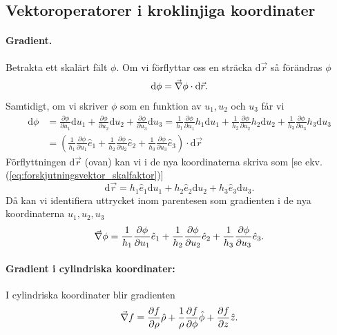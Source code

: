 \documentclass[%
oneside,                 %
final,                   %
10pt]{article}
\begin{document}
\subsection{Vektoroperatorer i kroklinjiga koordinater}

\paragraph{Gradient.}
Betrakta ett skalärt fält $\phi$.  Om vi förflyttar oss en sträcka $\mbox{d}\vec{r}$ så förändras $\phi$ 
\begin{equation}
  \mbox{d}\phi = \vec{\nabla} \phi \cdot \mbox{d}\vec{r}.
\end{equation}
Samtidigt, om vi skriver $\phi$ som en funktion av $u_1, u_2$ och $u_3$ får vi
\begin{align}
  \mbox{d}\phi &= \frac{\partial \phi}{\partial u_1}\mbox{d}u_1 + 
\frac{\partial \phi}{\partial u_2}\mbox{d}u_2 +
\frac{\partial \phi}{\partial u_3}\mbox{d}u_3 =
\frac{1}{h_1} \frac{\partial \phi}{\partial u_1} h_1 \mbox{d}u_1 +
\frac{1}{h_2} \frac{\partial \phi}{\partial u_2} h_2 \mbox{d}u_2 +
\frac{1}{h_3} \frac{\partial \phi}{\partial u_3} h_3 \mbox{d}u_3 \nonumber \\ 
 &=
\left(\frac{1}{h_1} \frac{\partial \phi}{\partial u_1} \hat{e}_1 +
\frac{1}{h_2} \frac{\partial \phi}{\partial u_2} \hat{e}_2 +
\frac{1}{h_3} \frac{\partial \phi}{\partial u_3} \hat{e}_3\right) \cdot 
\mbox{d}\vec{r}
\end{align}
Förflyttningen $\mbox{d}\vec{r}$ (ovan) kan vi i de nya koordinaterna skriva som [se ekv. (\ref{eq:forskjutningsvektor_skalfaktor})]
\begin{equation}
  \mbox{d}\vec{r} = h_1 \hat{e}_1 \mbox{d}u_1 + h_2 \hat{e}_2 \mbox{d}u_2
+ h_3 \hat{e}_3 \mbox{d}u_3.
\end{equation}
Då kan vi identifiera uttrycket inom parentesen som gradienten i de nya koordinaterna $u_1, u_2, u_3$
\begin{equation}
  \vec{\nabla} \phi = \frac{1}{h_1} \frac{\partial \phi}{\partial u_1} \hat{e}_1
+ \frac{1}{h_2}
\frac{\partial \phi}{\partial u_2} \hat{e}_2 
+ \frac{1}{h_3} \frac{\partial \phi}{\partial u_3} \hat{e}_3.
\end{equation}

\paragraph{Gradient i cylindriska koordinater:}
I cylindriska koordinater blir gradienten
\begin{equation}
  \vec{\nabla} f = \frac{\partial f}{\partial \rho} \hat{\rho} + \frac{1}{\rho}
\frac{\partial f}{\partial \phi} \hat{\phi} + \frac{\partial f}{\partial z} \hat{z}.
\end{equation}
\end{document}
